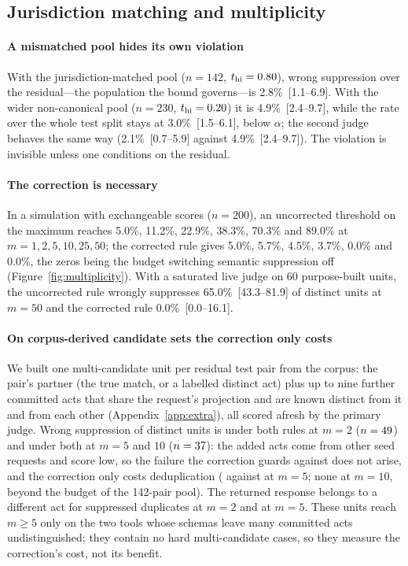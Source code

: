 

\subsection{Jurisdiction matching and multiplicity}\label{sec:res-bound}

\paragraph{A mismatched pool hides its own violation}
With the jurisdiction-matched pool ($n=142$, $t_{\mathrm{hi}}=0.80$), wrong suppression over the residual---the population the bound governs---is 2.8\%~[1.1--6.9]. With the wider non-canonical pool ($n=230$, $t_{\mathrm{hi}}=0.20$) it is 4.9\%~[2.4--9.7], while the rate over the whole test split stays at 3.0\%~[1.5--6.1], below $\alpha$; the second judge behaves the same way (2.1\%~[0.7--5.9] against 4.9\%~[2.4--9.7]). The violation is invisible unless one conditions on the residual.

\paragraph{The correction is necessary}
In a simulation with exchangeable scores ($n=200$), an uncorrected threshold on the maximum reaches 5.0\%, 11.2\%, 22.9\%, 38.3\%, 70.3\% and 89.0\% at $m=1,2,5,10,25,50$; the corrected rule gives 5.0\%, 5.7\%, 4.5\%, 3.7\%, 0.0\% and 0.0\%, the zeros being the budget switching semantic suppression off (Figure~\ref{fig:multiplicity}). With a saturated live judge on 60 purpose-built units, the uncorrected rule wrongly suppresses 65.0\%~[43.3--81.9] of distinct units at $m=50$ and the corrected rule 0.0\%~[0.0--16.1].

\paragraph{On corpus-derived candidate sets the correction only costs}
We built one multi-candidate unit per residual test pair from the corpus: the pair's partner (the true match, or a labelled distinct act) plus up to nine further committed acts that share the request's projection and are known distinct from it and from each other (Appendix~\ref{app:extra}), all scored afresh by the primary judge. Wrong suppression of distinct units is \mclWSUncTwo{} under both rules at $m=2$ ($n=49$) and \mclWSUncFive{} under both at $m=5$ and $10$ ($n=37$): the added acts come from other seed requests and score low, so the failure the correction guards against does not arise, and the correction only costs deduplication (\mclDedupUncFive{} against \mclDedupBonFive{} at $m=5$; none at $m=10$, beyond the budget of the 142-pair pool). The returned response belongs to a different act for \mclAttrCountUncTwo{} suppressed duplicates at $m=2$ and \mclAttrCountUncFive{} at $m=5$. These units reach $m\ge5$ only on the two tools whose schemas leave many committed acts undistinguished; they contain no hard multi-candidate cases, so they measure the correction's cost, not its benefit.


